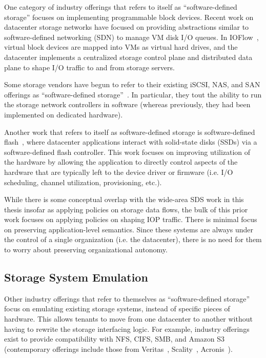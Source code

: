 One category of industry offerings that refers to itself as ``software-defined
storage'' focuses on implementing programmable block devices.
Recent work on datacenter storage networks have focused on providing
abstractions similar to software-defined networking (SDN) to manage VM disk I/O queues.  In
IOFlow~\cite{ioflow}, virtual block devices
are mapped into VMs as virtual hard drives, and the datacenter implements a
centralized storage control plane and distributed data plane to shape I/O traffic to and
from storage servers.

Some storage vendors have begun to refer to their existing iSCSI, NAS, and SAN offerings as
``software-defined storage''~\cite{computerweekly-storagebuzz}.  In particular,
they tout the ability to run the storage network controllers in
software (whereas previously, they had been implemented on dedicated hardware).

Another work that refers to itself as software-defined storage
is software-defined flash~\cite{sdf-baidu}, where
datacenter applications interact with solid-state disks (SSDs) via a
software-defined flash controller.  This work focuses on improving utilization
of the hardware by allowing the application to directly control aspects of the
hardware that are typically left to the device driver or firmware (i.e. I/O scheduling,
channel utilization, provisioning, etc.).

While there is some conceptual overlap with the wide-area SDS work in this
thesis insofar as applying policies on storage data flows,
the bulk of this prior work focuses on applying policies on shaping IOP traffic.  There
is minimal focus on preserving application-level semantics.  Since these systems are
always under the control of a single organization (i.e. the datacenter), there
is no need for them to worry about preserving organizational autonomy.

\subsection{Storage System Emulation}

Other industry offerings that refer to themselves as ``software-defined storage''
focus on emulating existing storage systems, instead of specific pieces of
hardware.  This allows tenants to move from one datacenter to another without having to
rewrite the storage interfacing logic.  For example, industry offerings exist to
provide compatibility with NFS, CIFS, SMB, and Amazon S3 (contemporary
offerings include those from
Veritas~\cite{veritas}, Scality~\cite{scality}, Acronis~\cite{acronis}).

